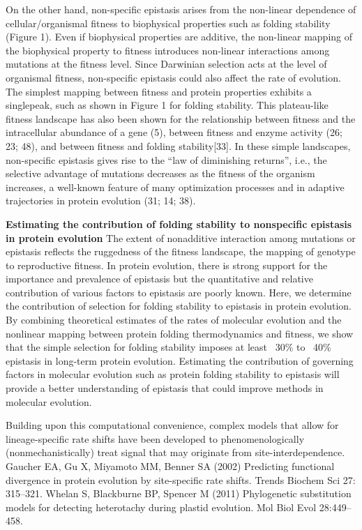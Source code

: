 On the other hand, non-specific epistasis arises from the non-linear dependence of
cellular/organismal fitness to biophysical properties such as folding stability (Figure 1). Even if biophysical properties are additive, the non-linear mapping of the biophysical property to fitness introduces non-linear interactions among mutations at the fitness level. Since Darwinian selection acts at the level of organismal fitness, non-specific epistasis could also affect the rate of evolution. The simplest mapping between fitness and protein properties exhibits a singlepeak, such as shown in Figure 1 for folding stability. This plateau-like fitness landscape has also been shown for the relationship between fitness and the intracellular abundance of a gene (5), between fitness and enzyme activity (26; 23; 48), and between fitness and folding stability[33]. In these simple landscapes, non-specific epistasis gives rise to the “law of diminishing returns”, i.e., the selective advantage of mutations decreases as the fitness of the organism increases, a well-known feature of many optimization processes and in adaptive trajectories in protein evolution (31; 14; 38).

\textbf{Estimating the contribution of folding stability to nonspecific epistasis in protein evolution }
The extent of nonadditive interaction among mutations or epistasis reflects the ruggedness of the fitness landscape, the mapping of genotype to reproductive fitness. In protein evolution, there is strong support for the importance and prevalence of epistasis but the quantitative and relative contribution of various factors to epistasis are poorly known. Here, we determine the contribution of selection for folding stability to epistasis in protein evolution. By combining theoretical estimates of the rates of molecular evolution and the nonlinear mapping between protein folding thermodynamics and fitness, we show that the simple selection for folding stability imposes at least ~30\% to ~40\% epistasis in long-term protein evolution. Estimating the contribution of governing factors in molecular evolution such as protein folding stability to epistasis will provide a better understanding of epistasis that could improve methods in molecular evolution.
 \citet{Dasmeh2018}


Building upon this computational convenience, complex models that allow for lineage-specific rate shifts have been developed to phenomenologically (nonmechanistically) treat signal that may originate from site-interdependence.
Gaucher EA, Gu X, Miyamoto MM, Benner SA (2002) Predicting functional divergence in protein evolution by site-specific rate shifts. Trends Biochem Sci 27: 315–321.
Whelan S, Blackburne BP, Spencer M (2011) Phylogenetic \gls{substitution} models for detecting heterotachy during plastid evolution. Mol Biol Evol 28:449–458.


